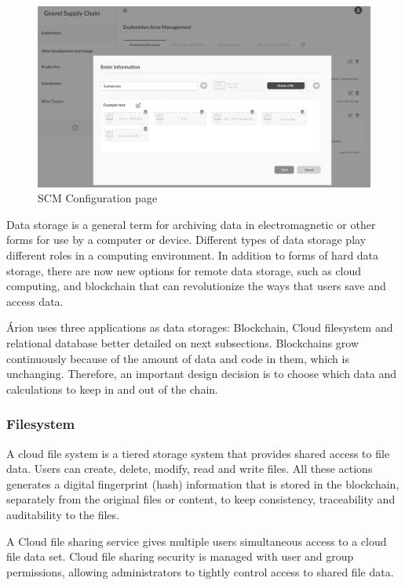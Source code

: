 \begin{figure}[ht]
\begin{center}
  \includegraphics[scale=0.265]{images/frontend02.png}
\caption{SCM Configuration page}
\label{fig:frontend02}
\end{center}
\end{figure}


Data storage is a general term for archiving data in electromagnetic or other forms for use by a computer or device. Different types of data storage play different roles in a computing environment. In addition to forms of hard data storage, there are now new options for remote data storage, such as cloud computing, and blockchain that can revolutionize the ways that users save and access data.  

Árion uses three applications as data storages: Blockchain, Cloud filesystem and relational database better detailed on next subsections. Blockchains grow continuously because of the amount of data and code in them, which is unchanging. Therefore, an important design decision is to choose which data and calculations to keep in and out of the chain.

\subsubsection{Filesystem}\label{sec:Filesystem}
A cloud file system is a tiered storage system that provides shared access to file data. Users can create, delete, modify, read and write files. All these actions generates a digital fingerprint (hash) information that is stored in the blockchain, separately from the original files or content, to keep consistency, traceability and auditability to the files.

A Cloud file sharing service gives multiple users simultaneous access to a cloud file data set. Cloud file sharing security is managed with user and group permissions, allowing administrators to tightly control access to shared file data.

